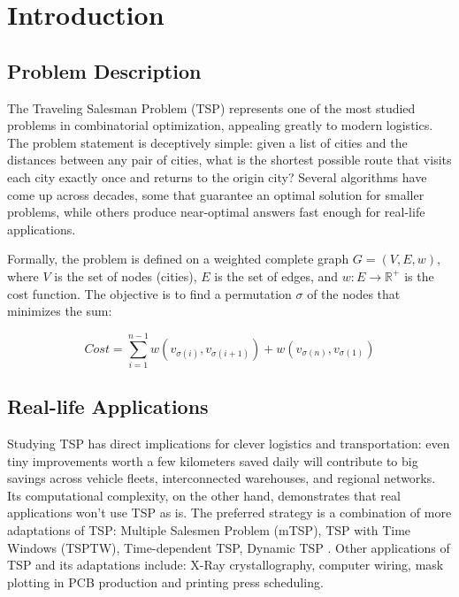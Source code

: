 \section{Introduction}
\label{sec:intro}

\subsection{Problem Description}

The Traveling Salesman Problem (TSP) represents one of the most studied problems in combinatorial optimization, appealing greatly to modern 
logistics. The problem statement is deceptively simple: given a list of cities and the distances between any pair of cities, what is the 
shortest possible route that visits each city exactly once and returns to the origin city? Several algorithms have come up across decades, some 
that guarantee an optimal solution for smaller problems, while others produce near-optimal answers fast enough for real-life applications.

Formally, the problem is defined on a weighted complete graph $G = (V, E, w)$, where $V$ is the set of nodes (cities), $E$ is the 
set of edges, and $w: E \to \mathbb{R}^+$ is the cost function. The objective is to find a permutation $\sigma$ of the nodes that 
minimizes the sum:

\begin{equation}
    Cost = \sum_{i=1}^{n-1} w(v_{\sigma(i)}, v_{\sigma(i+1)}) + w(v_{\sigma(n)}, v_{\sigma(1)})
\end{equation}

\subsection{Real-life Applications}

Studying TSP has direct implications for clever logistics and transportation: even tiny improvements worth a few kilometers saved daily will 
contribute to big savings across vehicle fleets, interconnected warehouses, and regional networks. Its computational complexity, on the other 
hand, demonstrates that real applications won't use TSP as is. The preferred strategy is a combination of more adaptations of TSP: Multiple 
Salesmen Problem (mTSP), TSP with Time Windows (TSPTW), Time-dependent TSP, Dynamic TSP \cite{tsp_adaptations}. 
Other applications of TSP and its adaptations include: X-Ray crystallography, computer wiring, mask plotting in PCB production and printing 
press scheduling. \cite{matai2010traveling}
